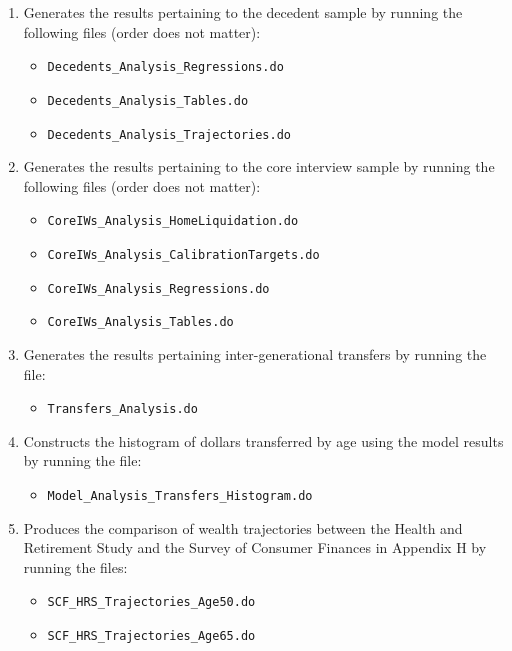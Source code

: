 \documentclass[a4,12p]{article}
\begin{document}
\begin{enumerate}

\item
Generates the results pertaining to the decedent sample by running the following files (order does not matter):
\begin{itemize} 
  \item {\tt Decedents\_Analysis\_Regressions.do}
  \item {\tt Decedents\_Analysis\_Tables.do}
  \item {\tt Decedents\_Analysis\_Trajectories.do}
\end{itemize}

\item 
Generates the results pertaining to the core interview sample by running the following files (order does not matter):
\begin{itemize} 
  \item {\tt CoreIWs\_Analysis\_HomeLiquidation.do}
  \item {\tt CoreIWs\_Analysis\_CalibrationTargets.do}
  \item {\tt CoreIWs\_Analysis\_Regressions.do}
  \item {\tt CoreIWs\_Analysis\_Tables.do}
\end{itemize}

\item 
Generates the results pertaining inter-generational transfers by running the file:
\begin{itemize} 
  \item {\tt Transfers\_Analysis.do}
\end{itemize}

\item 
Constructs the histogram of dollars transferred by age using the model results by running the file:
\begin{itemize} 
  \item {\tt Model\_Analysis\_Transfers\_Histogram.do}
\end{itemize}

\item 
Produces the comparison of wealth trajectories between the Health and Retirement Study and the Survey of Consumer Finances in Appendix H by running the files:
\begin{itemize} 
  \item {\tt SCF\_HRS\_Trajectories\_Age50.do}
  \item {\tt SCF\_HRS\_Trajectories\_Age65.do}
\end{itemize}
    
\end{enumerate}
\end{document}
